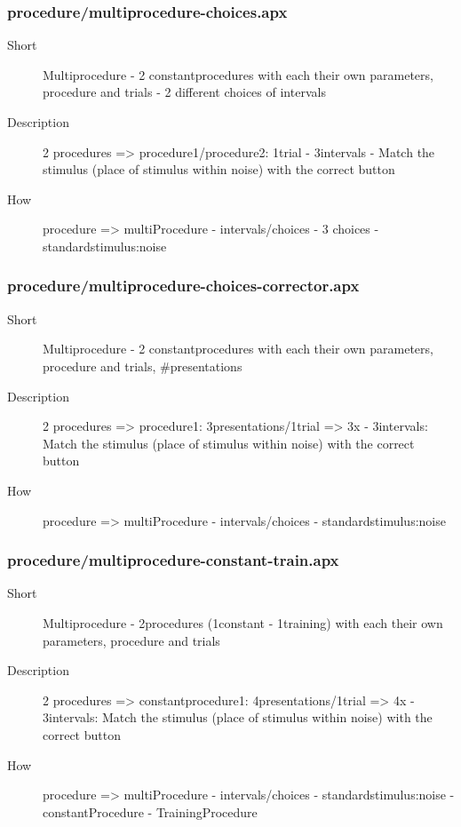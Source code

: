 \subsubsection{procedure/multiprocedure-choices.apx}
\begin{description}
\item[Short] 
 Multiprocedure - 2 constantprocedures with each their own parameters, procedure and trials - 2 different choices of intervals
\item[Description] 
 2 procedures =\textgreater{} procedure1/procedure2: 1trial - 3intervals - Match the stimulus (place of stimulus within noise) with the correct button
\item[How] 
 procedure =\textgreater{} multiProcedure - intervals/choices - 3 choices - standardstimulus:noise
\end{description}

\subsubsection{procedure/multiprocedure-choices-corrector.apx}
\begin{description}
\item[Short] 
 Multiprocedure - 2 constantprocedures with each their own parameters, procedure and trials, \#presentations
\item[Description] 
 2 procedures =\textgreater{} procedure1: 3presentations/1trial =\textgreater{} 3x - 3intervals: Match the stimulus (place of stimulus within noise) with the correct button
\item[How] 
 procedure =\textgreater{} multiProcedure - intervals/choices - standardstimulus:noise
\end{description}

\subsubsection{procedure/multiprocedure-constant-train.apx}
\begin{description}
\item[Short] 
 Multiprocedure - 2procedures (1constant - 1training) with each their own parameters, procedure and trials
\item[Description] 
 2 procedures =\textgreater{} constantprocedure1: 4presentations/1trial =\textgreater{} 4x - 3intervals: Match the stimulus (place of stimulus within noise) with the correct button
\item[How] 
 procedure =\textgreater{} multiProcedure - intervals/choices - standardstimulus:noise - constantProcedure - TrainingProcedure
\end{description}

